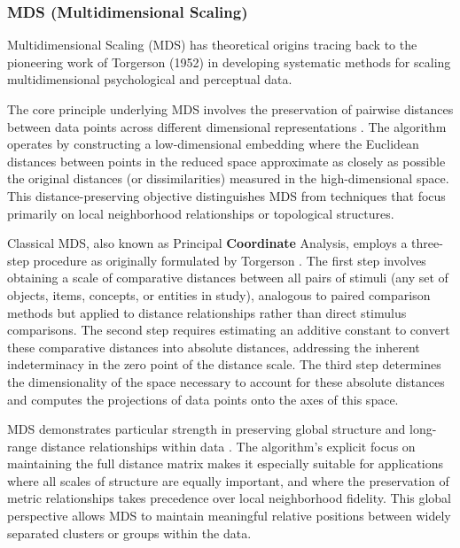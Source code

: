 \subsubsection{MDS (Multidimensional Scaling)}

Multidimensional Scaling (MDS) has theoretical origins tracing back to the pioneering work of Torgerson (1952) \cite{torgerson1952mds} in developing systematic methods for scaling multidimensional psychological and perceptual data. 

The core principle underlying MDS involves the preservation of pairwise distances between data points across different dimensional representations \cite{torgerson1952mds, mcinnes2020umap}. The algorithm operates by constructing a low-dimensional embedding where the Euclidean distances between points in the reduced space approximate as closely as possible the original distances (or dissimilarities) measured in the high-dimensional space. This distance-preserving objective distinguishes MDS from techniques that focus primarily on local neighborhood relationships or topological structures.

Classical MDS, also known as Principal \textbf{Coordinate} Analysis, employs a three-step procedure as originally formulated by Torgerson \cite{torgerson1952mds}.
The first step involves obtaining a scale of comparative distances between all pairs of stimuli (any set of objects, items, concepts, or entities in study), analogous to paired comparison methods but applied to distance relationships rather than direct stimulus comparisons. The second step requires estimating an additive constant to convert these comparative distances into absolute distances, addressing the inherent indeterminacy in the zero point of the distance scale. The third step determines the dimensionality of the space necessary to account for these absolute distances and computes the projections of data points onto the axes of this space.

MDS demonstrates particular strength in preserving global structure and long-range distance relationships within data \cite{mcinnes2020umap}. The algorithm's explicit focus on maintaining the full distance matrix makes it especially suitable for applications where all scales of structure are equally important, and where the preservation of metric relationships takes precedence over local neighborhood fidelity. This global perspective allows MDS to maintain meaningful relative positions between widely separated clusters or groups within the data.


